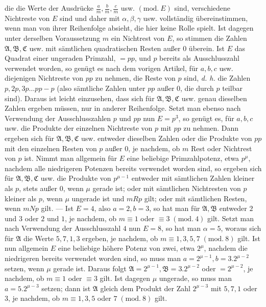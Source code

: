 die die Werte der Ausdrücke \(\frac am,\allowbreak \frac bm,\allowbreak \frac cm\) usw. \((\mathrm{mod.}\ E)\) sind, verschiedene Nichtreste von \(E\) sind und daher mit \(\alpha,\allowbreak \beta,\allowbreak \gamma\) usw. vollständig übereinstimmen, wenn man von ihrer Reihenfolge absieht, die hier keine Rolle spielt. Ist dagegen unter derselben Voraussetzung \(m\) ein Nichtrest von \(E\), so stimmen die Zahlen \(\mathfrak A,\allowbreak \mathfrak B,\allowbreak \mathfrak C\) usw. mit sämtlichen quadratischen Resten außer \(0\) überein. Ist \(E\) das Quadrat einer ungeraden Primzahl, \(=pp\), und \(p\) bereits als Ausschlusszahl verwendet worden, so genügt es nach dem vorigen Artikel, für \(a,\allowbreak b,\allowbreak c\) usw. diejenigen Nichtreste von \(pp\) zu nehmen, die Reste von \(p\) sind, \textit{d. h.} die Zahlen \(p,\allowbreak 2p,\allowbreak 3p\ldots pp-p\) (also sämtliche Zahlen unter \(pp\) außer \(0\), die durch \(p\) teilbar sind). Daraus ist leicht einzusehen, dass sich für \(\mathfrak A,\allowbreak \mathfrak B,\allowbreak \mathfrak C\) usw. genau dieselben Zahlen ergeben müssen, nur in anderer Reihenfolge. Setzt man ebenso nach Verwendung der Ausschlusszahlen \(p\) und \(pp\) nun \(E=p^3\), so genügt es, für \(a,\allowbreak b,\allowbreak c\) usw. die Produkte der einzelnen Nichtreste von \(p\) mit \(pp\) zu nehmen. Dann ergeben sich für \(\mathfrak A,\allowbreak \mathfrak B,\allowbreak \mathfrak C\) usw. entweder dieselben Zahlen oder die Produkte von \(pp\) mit den einzelnen Resten von \(p\) außer \(0\), je nachdem, ob \(m\) Rest oder Nichtrest von \(p\) ist. Nimmt man allgemein für \(E\) eine beliebige Primzahlpotenz, etwa \(p^\mu\), nachdem alle niedrigeren Potenzen bereits verwendet worden sind, so ergeben sich für \(\mathfrak A,\allowbreak \mathfrak B,\allowbreak \mathfrak C\) usw. die Produkte von \(p^{\mu-1}\) entweder mit sämtlichen Zahlen kleiner als \(p\), stets außer \(0\), wenn \(\mu\) gerade ist; oder mit sämtlichen Nichtresten von \(p\) kleiner als \(p\), wenn \(\mu\) ungerade ist und \(mRp\) gilt; oder mit sämtlichen Resten, wenn \(mNp\) gilt. — Ist \(E=4\), also \(a=2,\allowbreak b=3\), so hat man für \(\mathfrak A,\allowbreak \mathfrak B\) entweder \(2\) und \(3\) oder \(2\) und \(1\), je nachdem, ob \(m\equiv1\) oder \(\equiv3\; (\mathrm{mod}.\ 4)\) gilt. Setzt man nach Verwendung der Ausschlusszahl \(4\) nun \(E=8\), so hat man \(\alpha=5\), woraus sich für \(\mathfrak A\) die Werte \(5,\allowbreak 7,\allowbreak 1,\allowbreak 3\) ergeben, je nachdem, ob \(m\equiv1,\allowbreak 3,\allowbreak 5,\allowbreak 7\; (\mathrm{mod}.\ 8)\) gilt. Ist nun allgemein \(E\) eine beliebige höhere Potenz von zwei, etwa \(2^\mu\), nachdem die niedrigeren bereits verwendet worden sind, so muss man \(a=2^{\mu-1},\allowbreak b=3.2^{\mu-2}\) setzen, wenn \(\mu\) gerade ist. Daraus folgt \(\mathfrak A=2^{\mu-1},\allowbreak \mathfrak B=3.2^{\mu-2}\) oder \(=2^{\mu-2}\), je nachdem, ob \(m\equiv1\) oder \(\equiv3\) gilt. Ist dagegen \(\mu\) ungerade, so muss man \(a=5.2^{\mu-3}\) setzen; dann ist \(\mathfrak A\) gleich dem Produkt der Zahl \(2^{\mu-3}\) mit \(5,\allowbreak 7,\allowbreak 1\) oder \(3\), je nachdem, ob \(m\equiv1,\allowbreak 3,\allowbreak 5\) oder \(7\; (\mathrm{mod}.\ 8)\) gilt.


